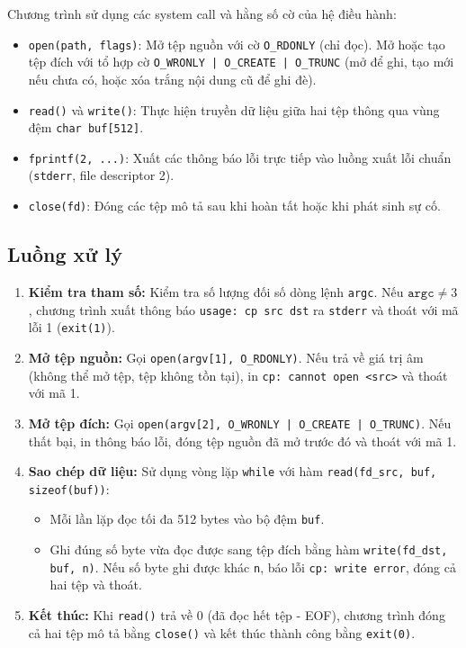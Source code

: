 Chương trình sử dụng các system call và hằng số cờ của hệ điều hành:
\begin{itemize}
  \item \texttt{open(path, flags)}: Mở tệp nguồn với cờ \texttt{O\_RDONLY} (chỉ đọc). Mở hoặc tạo tệp đích với tổ hợp cờ \texttt{O\_WRONLY | O\_CREATE | O\_TRUNC} (mở để ghi, tạo mới nếu chưa có, hoặc xóa trắng nội dung cũ để ghi đè).
  \item \texttt{read()} và \texttt{write()}: Thực hiện truyền dữ liệu giữa hai tệp thông qua vùng đệm \texttt{char buf[512]}.
  \item \texttt{fprintf(2, ...)}: Xuất các thông báo lỗi trực tiếp vào luồng xuất lỗi chuẩn (\texttt{stderr}, file descriptor 2).
  \item \texttt{close(fd)}: Đóng các tệp mô tả sau khi hoàn tất hoặc khi phát sinh sự cố.
\end{itemize}

\subsection{Luồng xử lý}
\begin{enumerate}
  \item \textbf{Kiểm tra tham số:} Kiểm tra số lượng đối số dòng lệnh \texttt{argc}. Nếu $\texttt{argc} \neq 3$, chương trình xuất thông báo \texttt{usage: cp src dst} ra \texttt{stderr} và thoát với mã lỗi 1 (\texttt{exit(1)}).
  \item \textbf{Mở tệp nguồn:} Gọi \texttt{open(argv[1], O\_RDONLY)}. Nếu trả về giá trị âm (không thể mở tệp, tệp không tồn tại), in \texttt{cp: cannot open <src>} và thoát với mã 1.
  \item \textbf{Mở tệp đích:} Gọi \texttt{open(argv[2], O\_WRONLY | O\_CREATE | O\_TRUNC)}. Nếu thất bại, in thông báo lỗi, đóng tệp nguồn đã mở trước đó và thoát với mã 1.
  \item \textbf{Sao chép dữ liệu:} Sử dụng vòng lặp \texttt{while} với hàm \texttt{read(fd\_src, buf, sizeof(buf))}:
    \begin{itemize}
      \item Mỗi lần lặp đọc tối đa 512 bytes vào bộ đệm \texttt{buf}.
      \item Ghi đúng số byte vừa đọc được sang tệp đích bằng hàm \texttt{write(fd\_dst, buf, n)}. Nếu số byte ghi được khác \texttt{n}, báo lỗi \texttt{cp: write error}, đóng cả hai tệp và thoát.
    \end{itemize}
  \item \textbf{Kết thúc:} Khi \texttt{read()} trả về 0 (đã đọc hết tệp - EOF), chương trình đóng cả hai tệp mô tả bằng \texttt{close()} và kết thúc thành công bằng \texttt{exit(0)}.
\end{enumerate}

